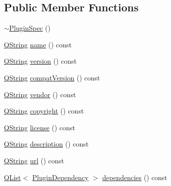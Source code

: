 \subsection*{Public Member Functions}
\begin{DoxyCompactItemize}
\item 
\hyperlink{class_extension_system_1_1_plugin_spec_a36fc0d85c9607b850b79415a6588c496}{$\sim$\-Plugin\-Spec} ()
\item 
\hyperlink{group___u_a_v_objects_plugin_gab9d252f49c333c94a72f97ce3105a32d}{Q\-String} \hyperlink{class_extension_system_1_1_plugin_spec_a822492851bc8d91f2e82960fbf6303ff}{name} () const 
\item 
\hyperlink{group___u_a_v_objects_plugin_gab9d252f49c333c94a72f97ce3105a32d}{Q\-String} \hyperlink{class_extension_system_1_1_plugin_spec_aa4e3f800e656d5c849a91247fa4a5b71}{version} () const 
\item 
\hyperlink{group___u_a_v_objects_plugin_gab9d252f49c333c94a72f97ce3105a32d}{Q\-String} \hyperlink{class_extension_system_1_1_plugin_spec_a45b8cc109ac512b48cf3781d9189959e}{compat\-Version} () const 
\item 
\hyperlink{group___u_a_v_objects_plugin_gab9d252f49c333c94a72f97ce3105a32d}{Q\-String} \hyperlink{class_extension_system_1_1_plugin_spec_a192dfd0c30392c994303743b8ad76d83}{vendor} () const 
\item 
\hyperlink{group___u_a_v_objects_plugin_gab9d252f49c333c94a72f97ce3105a32d}{Q\-String} \hyperlink{class_extension_system_1_1_plugin_spec_aedb8b15a0ecdf0d8b2ac27911594d585}{copyright} () const 
\item 
\hyperlink{group___u_a_v_objects_plugin_gab9d252f49c333c94a72f97ce3105a32d}{Q\-String} \hyperlink{class_extension_system_1_1_plugin_spec_aa0aea3276267028b56289d0f594089dd}{license} () const 
\item 
\hyperlink{group___u_a_v_objects_plugin_gab9d252f49c333c94a72f97ce3105a32d}{Q\-String} \hyperlink{class_extension_system_1_1_plugin_spec_a971d59d3293bca9fc1f312542d380a57}{description} () const 
\item 
\hyperlink{group___u_a_v_objects_plugin_gab9d252f49c333c94a72f97ce3105a32d}{Q\-String} \hyperlink{class_extension_system_1_1_plugin_spec_a567faa06e5f2f469ff34a53cc45cc6eb}{url} () const 
\item 
\hyperlink{class_q_list}{Q\-List}$<$ \hyperlink{struct_extension_system_1_1_plugin_dependency}{Plugin\-Dependency} $>$ \hyperlink{class_extension_system_1_1_plugin_spec_aea2dc5245d57466a867e7f59a11a6af5}{dependencies} () const 

\end{DoxyCompactItemize}
